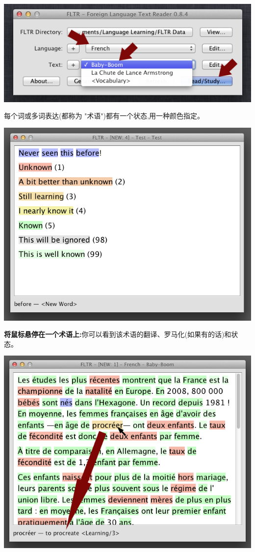\documentclass[cn,10pt,math=newtx,citestyle=gb7714-2015,bibstyle=gb7714-2015]{elegantbook}
\begin{document}
\includegraphics[scale=0.6]{image/images-039.png}

每个词或多词表达(都称为 "术语")都有一个状态,用一种颜色指定。

\includegraphics[scale=0.6]{image/images-041.png}

\textbf{将鼠标悬停在一个术语上:}你可以看到该术语的翻译、罗马化(如果有的话)和状态。

\includegraphics[scale=0.6]{image/images-042.png}
\end{document}
